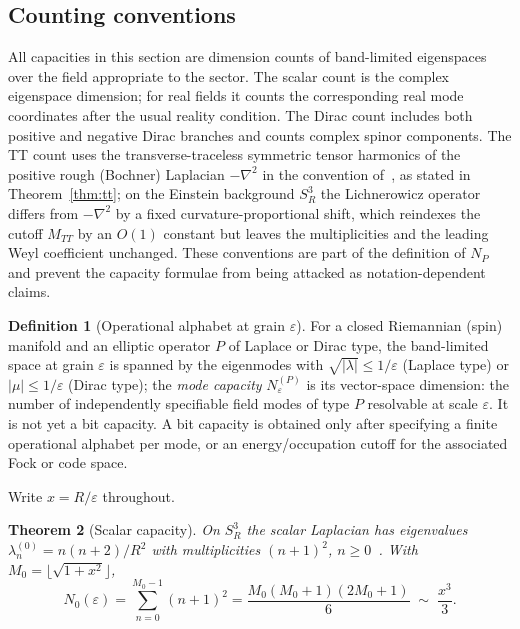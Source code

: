 \documentclass[11pt,a4paper]{article}
\newtheorem{theorem}{Theorem}[section]
\theoremstyle{definition}
\newtheorem{definition}[theorem]{Definition}
\theoremstyle{remark}
\newcommand{\Sthree}{S^{3}}
\begin{document}
\subsection*{Counting conventions}
All capacities in this section are dimension counts of band-limited eigenspaces over the field
appropriate to the sector.  The scalar count is the complex eigenspace dimension; for real
fields it counts the corresponding real mode coordinates after the usual reality condition.
The Dirac count includes both positive and negative Dirac branches and counts complex spinor
components.  The TT count uses the transverse-traceless symmetric tensor harmonics of the positive rough
(Bochner) Laplacian $-\nabla^{2}$ in the convention of~\cite{RubinOrdonez1984}, as stated in
Theorem~\ref{thm:tt}; on the Einstein background $\Sthree_{R}$ the Lichnerowicz operator
differs from $-\nabla^{2}$ by a fixed curvature-proportional shift, which reindexes the cutoff
$M_{TT}$ by an $O(1)$ constant but leaves the multiplicities and the leading Weyl coefficient
unchanged.  These conventions are
part of the definition of $N_P$ and prevent the capacity formulae from being attacked as
notation-dependent claims.

\begin{definition}[Operational alphabet at grain $\varepsilon$]
For a closed Riemannian (spin) manifold and an elliptic operator $P$ of Laplace or Dirac type,
the band-limited space at grain $\varepsilon$ is spanned by the eigenmodes with
$\sqrt{|\lambda|}\le1/\varepsilon$ (Laplace type) or $|\mu|\le1/\varepsilon$ (Dirac type); the
\emph{mode capacity} $N^{(P)}_{\varepsilon}$ is its vector-space dimension: the number of independently
specifiable field modes of type $P$ resolvable at scale $\varepsilon$.  It is not yet a bit
capacity.  A bit capacity is obtained only after specifying a finite operational alphabet per
mode, or an energy/occupation cutoff for the associated Fock or code space.
\end{definition}

Write $x=R/\varepsilon$ throughout.

\begin{theorem}[Scalar capacity]
\label{thm:scalar}
On $\Sthree_{R}$ the scalar Laplacian has eigenvalues $\lambda^{(0)}_{n}=n(n+2)/R^{2}$ with
multiplicities $(n+1)^{2}$, $n\ge0$~\cite{PB2026susp}.  With
$M_{0}=\big\lfloor\sqrt{1+x^{2}}\big\rfloor$,
\begin{equation}
N_{0}(\varepsilon)=\sum_{n=0}^{M_{0}-1}(n+1)^{2}
=\frac{M_{0}(M_{0}+1)(2M_{0}+1)}{6}
\;\sim\;\frac{x^{3}}{3}.
\label{eq:N0}
\end{equation}
\end{theorem}
\end{document}
